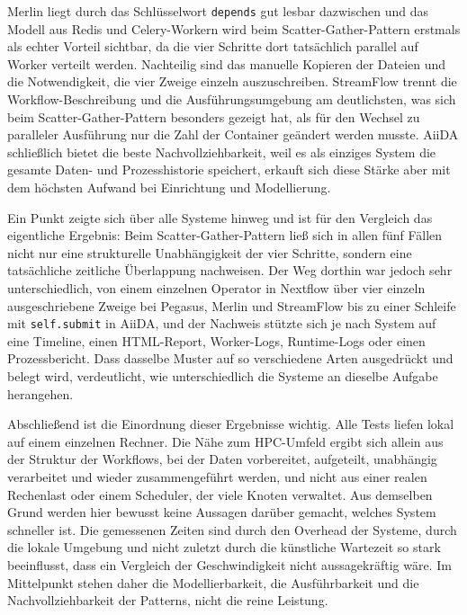 Merlin liegt durch das Schlüsselwort \texttt{depends} gut lesbar dazwischen und das Modell aus
Redis und Celery-Workern wird beim Scatter-Gather-Pattern erstmals als echter Vorteil sichtbar, da
die vier Schritte dort tatsächlich parallel auf Worker verteilt werden. Nachteilig sind das
manuelle Kopieren der Dateien und die Notwendigkeit, die vier Zweige einzeln auszuschreiben.
StreamFlow trennt die Workflow-Beschreibung und die Ausführungsumgebung am deutlichsten, was sich
beim Scatter-Gather-Pattern besonders gezeigt hat, als für den Wechsel zu paralleler Ausführung nur
die Zahl der Container geändert werden musste. AiiDA schließlich bietet die beste Nachvollziehbarkeit, weil es als einziges System die
gesamte Daten- und Prozesshistorie speichert, erkauft sich diese Stärke aber mit dem höchsten
Aufwand bei Einrichtung und Modellierung.

Ein Punkt zeigte sich über alle Systeme hinweg und ist für den Vergleich das eigentliche Ergebnis:
Beim Scatter-Gather-Pattern ließ sich in allen fünf Fällen nicht nur eine strukturelle
Unabhängigkeit der vier Schritte, sondern eine tatsächliche zeitliche Überlappung nachweisen. Der
Weg dorthin war jedoch sehr unterschiedlich, von einem einzelnen Operator in Nextflow über vier
einzeln ausgeschriebene Zweige bei Pegasus, Merlin und StreamFlow bis zu einer Schleife mit
\texttt{self.submit} in AiiDA, und der Nachweis stützte sich je nach System auf eine Timeline,
einen HTML-Report, Worker-Logs, Runtime-Logs oder einen Prozessbericht. Dass dasselbe Muster auf so
verschiedene Arten ausgedrückt und belegt wird, verdeutlicht, wie unterschiedlich die Systeme an
dieselbe Aufgabe herangehen.

Abschließend ist die Einordnung dieser Ergebnisse wichtig. Alle Tests liefen lokal auf einem
einzelnen Rechner. Die Nähe zum HPC-Umfeld ergibt sich
allein aus der Struktur der Workflows, bei der Daten vorbereitet, aufgeteilt, unabhängig
verarbeitet und wieder zusammengeführt werden, und nicht aus einer realen Rechenlast oder einem
Scheduler, der viele Knoten verwaltet. Aus demselben Grund werden hier bewusst keine Aussagen
darüber gemacht, welches System schneller ist. Die gemessenen Zeiten sind durch den Overhead der
Systeme, durch die lokale Umgebung und nicht zuletzt durch die künstliche Wartezeit so stark
beeinflusst, dass ein Vergleich der Geschwindigkeit nicht aussagekräftig wäre. Im Mittelpunkt
stehen daher die Modellierbarkeit, die Ausführbarkeit und die Nachvollziehbarkeit der Patterns,
nicht die reine Leistung.